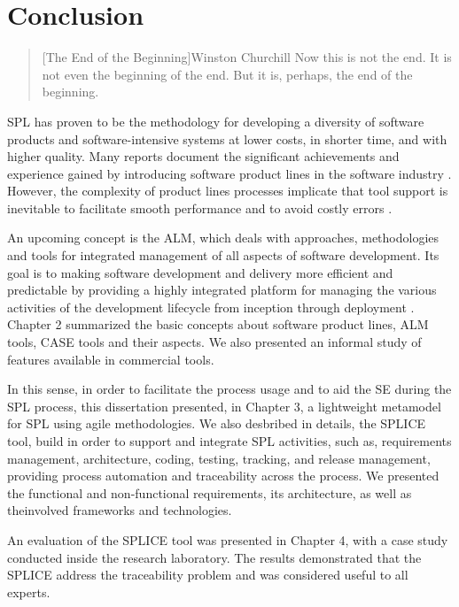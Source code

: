 \chapter{Conclusion}
\label{ch:conclusion}

\begin{quotation}[The End of the Beginning]{Winston Churchill }
Now this is not the end. It is not even the beginning of the end. But it is, perhaps, the end of the beginning.
\end{quotation}

\acf{SPL} has proven to be the methodology for developing a diversity of software products and software-intensive systems at lower costs, in shorter time, and with higher quality. Many reports document the significant achievements and experience gained by introducing software product lines in the software industry \citep{Pohl2005}. However, the complexity of product lines processes implicate that tool support is inevitable to facilitate smooth performance and to avoid costly errors \citep{Dhungana2007}. 

An upcoming concept is the \acf{ALM}, which deals with approaches, methodologies and tools for integrated management of all aspects of software development. Its goal is to making software development and delivery more efficient and predictable by providing a highly integrated platform for managing the various activities of the development lifecycle from inception through deployment \citep{kaariainen2011towards}. Chapter 2 summarized the basic concepts about software product lines, \ac{ALM} tools, \ac{CASE} tools and their aspects. We also presented an informal study of features available in commercial tools.

In this sense, in order to facilitate the process usage and to aid the \acf{SE} during the \ac{SPL} process, this dissertation presented, in Chapter 3, a lightweight metamodel for \ac{SPL} using agile methodologies. We also desbribed in details, the \acf{SPLICE} tool, build in order to support and integrate \ac{SPL} activities, such as, requirements management, architecture, coding, testing, tracking, and release management, providing process automation and traceability across the process. We presented the functional and non-functional requirements, its architecture, as well as theinvolved frameworks and technologies.

An evaluation of the \ac{SPLICE} tool was presented in Chapter 4, with a case study conducted inside the research laboratory. The results demonstrated that the \ac{SPLICE} address the traceability problem and was considered useful to all experts.

